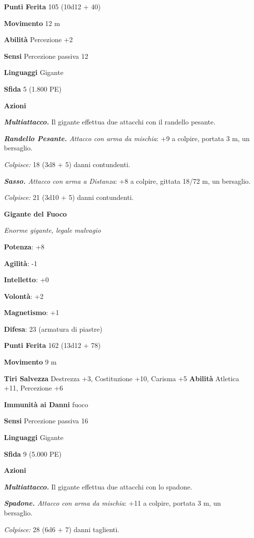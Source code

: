 \begin{multicols}{2}
\textbf{Punti Ferita} 105 (10d12 + 40)

\textbf{Movimento} 12 m

\textbf{Abilità} Percezione +2

\textbf{Sensi} Percezione passiva 12

\textbf{Linguaggi} Gigante

\textbf{Sfida} 5 (1.800 PE)

\textbf{Azioni}

\emph{\textbf{Multiattacco.}} Il gigante effettua due attacchi con il
randello pesante.

\emph{\textbf{Randello Pesante.} Attacco con arma da mischia}: +9 a
colpire, portata 3 m, un bersaglio.

\emph{Colpisce:} 18 (3d8 + 5) danni contundenti.

\emph{\textbf{Sasso.} Attacco con arma a Distanza}: +8 a colpire,
gittata 18/72 m, un bersaglio.

\emph{Colpisce:} 21 (3d10 + 5) danni contundenti.

\textbf{Gigante del Fuoco}

\emph{Enorme gigante, legale malvagio}

\textbf{Potenza}: +8

\textbf{Agilità}: -1

\textbf{Intelletto}: +0

\textbf{Volontà}: +2

\textbf{Magnetismo}: +1

\textbf{Difesa}: 23 (armatura di piastre)

\textbf{Punti Ferita} 162 (13d12 + 78)

\textbf{Movimento} 9 m

\textbf{Tiri Salvezza} Destrezza +3, Costituzione +10, Carisma +5
\textbf{Abilità} Atletica +11, Percezione +6

\textbf{Immunità ai Danni} fuoco

\textbf{Sensi} Percezione passiva 16

\textbf{Linguaggi} Gigante

\textbf{Sfida} 9 (5.000 PE)

\textbf{Azioni}

\emph{\textbf{Multiattacco.}} Il gigante effettua due attacchi con lo
spadone.

\emph{\textbf{Spadone.} Attacco con arma da mischia}: +11 a colpire,
portata 3 m, un bersaglio.

\emph{Colpisce:} 28 (6d6 + 7) danni taglienti.


\end{multicols}
